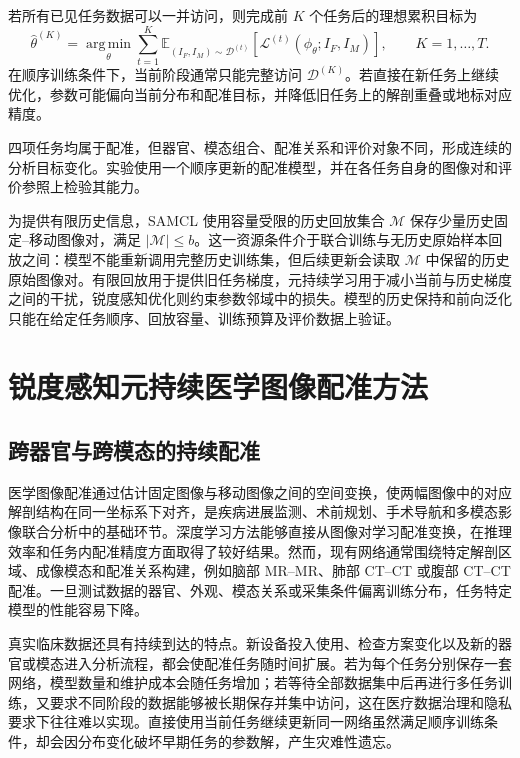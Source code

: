 若所有已见任务数据可以一并访问，则完成前 $K$ 个任务后的理想累积目标为
\begin{equation}
\widehat{\theta}^{(K)}
=
\operatorname*{arg\,min}_{\theta}
\sum_{t=1}^{K}
\mathbb{E}_{(I_F,I_M)\sim\mathcal{D}^{(t)}}
\left[
\mathcal{L}^{(t)}(\phi_{\theta};I_F,I_M)
\right],
\qquad K=1,\ldots,T.
\label{eq:samcl-cumulative-objective}
\end{equation}
在顺序训练条件下，当前阶段通常只能完整访问 $\mathcal{D}^{(K)}$。若直接在新任务上继续优化，参数可能偏向当前分布和配准目标，并降低旧任务上的解剖重叠或地标对应精度。

四项任务均属于配准，但器官、模态组合、配准关系和评价对象不同，形成连续的分析目标变化。实验使用一个顺序更新的配准模型，并在各任务自身的图像对和评价参照上检验其能力。

为提供有限历史信息，SAMCL 使用容量受限的历史回放集合 $\mathcal{M}$ 保存少量历史固定--移动图像对，满足
$|\mathcal{M}|\leq b$。这一资源条件介于联合训练与无历史原始样本回放之间：模型不能重新调用完整历史训练集，但后续更新会读取 $\mathcal{M}$ 中保留的历史原始图像对。有限回放用于提供旧任务梯度，元持续学习用于减小当前与历史梯度之间的干扰，锐度感知优化则约束参数邻域中的损失。模型的历史保持和前向泛化只能在给定任务顺序、回放容量、训练预算及评价数据上验证。

\section{锐度感知元持续医学图像配准方法}
\label{sec:samcl}

\subsection{跨器官与跨模态的持续配准}
\label{subsec:samcl-motivation}

医学图像配准通过估计固定图像与移动图像之间的空间变换，使两幅图像中的对应解剖结构在同一坐标系下对齐，是疾病进展监测、术前规划、手术导航和多模态影像联合分析中的基础环节\cite{maintz1998registration,gupta2021registration,maes1997mutualinformation,sotiras2013deformable}。深度学习方法能够直接从图像对学习配准变换，在推理效率和任务内配准精度方面取得了较好结果\cite{haskins2020deepreg,balakrishnan2019voxelmorph}。然而，现有网络通常围绕特定解剖区域、成像模态和配准关系构建，例如脑部 MR--MR、肺部 CT--CT 或腹部 CT--CT 配准\cite{kang2022dual,che2023amnet,hering2021lungreg}。一旦测试数据的器官、外观、模态关系或采集条件偏离训练分布，任务特定模型的性能容易下降。

真实临床数据还具有持续到达的特点。新设备投入使用、检查方案变化以及新的器官或模态进入分析流程，都会使配准任务随时间扩展。若为每个任务分别保存一套网络，模型数量和维护成本会随任务增加；若等待全部数据集中后再进行多任务训练，又要求不同阶段的数据能够被长期保存并集中访问，这在医疗数据治理和隐私要求下往往难以实现\cite{lee2020clinicalcl,vokinger2021medicaldevices}。直接使用当前任务继续更新同一网络虽然满足顺序训练条件，却会因分布变化破坏早期任务的参数解，产生灾难性遗忘\cite{thrun1995lifelong,mccloskey1989catastrophic,delange2022continual}。

